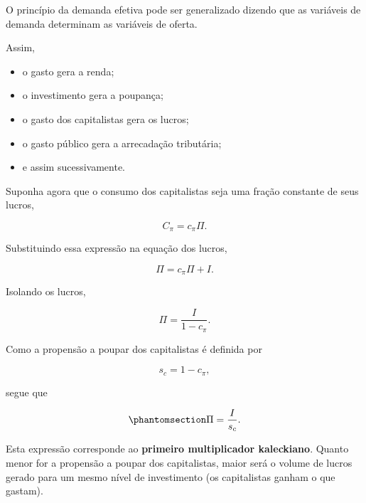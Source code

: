 \documentclass[
  brazilian,
  letterpaper,
  DIV=11,
  numbers=noendperiod]{scrreprt}
\providecommand{\tightlist}{%
  \setlength{\itemsep}{0pt}\setlength{\parskip}{0pt}}
\begin{document}
\begin{tcolorbox}[enhanced jigsaw, arc=.35mm, bottomrule=.15mm, bottomtitle=1mm, breakable, colback=white, colbacktitle=quarto-callout-important-color!10!white, colframe=quarto-callout-important-color-frame, coltitle=black, left=2mm, leftrule=.75mm, opacityback=0, opacitybacktitle=0.6, rightrule=.15mm, title=\textcolor{quarto-callout-important-color}{\faExclamation}\hspace{0.5em}{Generalização}, titlerule=0mm, toprule=.15mm, toptitle=1mm]

O princípio da demanda efetiva pode ser generalizado dizendo que as
variáveis de demanda determinam as variáveis de oferta.

Assim,

\begin{itemize}
\tightlist
\item
  o gasto gera a renda;
\item
  o investimento gera a poupança;
\item
  o gasto dos capitalistas gera os lucros;
\item
  o gasto público gera a arrecadação tributária;
\item
  e assim sucessivamente.
\end{itemize}

\end{tcolorbox}

Suponha agora que o consumo dos capitalistas seja uma fração constante
de seus lucros,

\[C_{\pi} = c_{\pi} \Pi.\]

Substituindo essa expressão na equação dos lucros,

\[\Pi = c_{\pi}\Pi + I.\]

Isolando os lucros,

\[\Pi = \frac{I}{1-c_{\pi}}.\]

Como a propensão a poupar dos capitalistas é definida por

\[s_c = 1-c_{\pi},\]

segue que

\begin{equation}\protect\phantomsection\label{eq-multlucros}{\Pi = \frac{I}{s_c}.}\end{equation}

Esta expressão corresponde ao \textbf{primeiro multiplicador
kaleckiano}. Quanto menor for a propensão a poupar dos capitalistas,
maior será o volume de lucros gerado para um mesmo nível de investimento
(os capitalistas ganham o que gastam).
\end{document}
